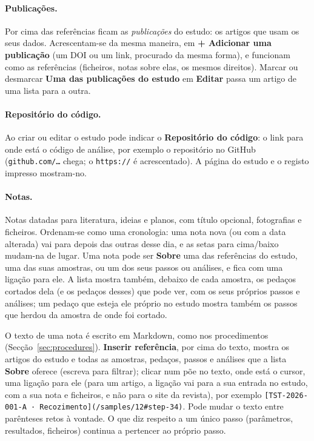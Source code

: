 \documentclass[11pt,a4paper]{article}
\newcommand{\ui}[1]{\textsf{\textbf{#1}}}
\begin{document}
\paragraph{Publicações.} Por cima das referências ficam as
\emph{publicações} do estudo: os artigos que usam os seus dados. Acrescentam-se
da mesma maneira, em \ui{+ Adicionar uma publicação} (um DOI ou um link,
procurado da mesma forma), e funcionam como as referências (ficheiros, notas
sobre elas, os mesmos direitos). Marcar ou desmarcar
\ui{Uma das publicações do estudo} em \ui{Editar} passa um artigo de uma
lista para a outra.

\paragraph{Repositório do código.} Ao criar ou editar o estudo pode indicar
o \ui{Repositório do código}: o link para onde está o código de análise, por
exemplo o repositório no GitHub (\texttt{github.com/\ldots} chega; o
\texttt{https://} é acrescentado). A página do estudo e o registo impresso
mostram-no.

\paragraph{Notas.} Notas datadas para literatura, ideias e planos, com
título opcional, fotografias e ficheiros. Ordenam-se como uma cronologia:
uma nota nova (ou com a data alterada) vai para depois das outras desse dia,
e as setas para cima/baixo mudam-na de lugar. Uma nota pode ser \ui{Sobre} uma
das referências do estudo, uma das suas amostras, ou um dos seus passos ou
análises, e fica com uma
ligação para ele. A lista mostra também, debaixo de cada amostra, os pedaços
cortados dela (e os pedaços desses) que pode ver, com os seus próprios passos
e análises; um pedaço que esteja ele próprio no estudo mostra também os passos
que herdou da amostra de onde foi cortado.

O texto de uma nota é escrito em Markdown, como nos procedimentos
(Secção~\ref{sec:procedures}). \ui{Inserir referência}, por cima do texto,
mostra os artigos do estudo e todas as amostras, pedaços, passos e análises
que a lista \ui{Sobre} oferece (escreva para filtrar); clicar num põe no
texto, onde está o cursor, uma ligação para ele (para um artigo, a ligação vai
para a sua entrada no estudo, com a sua nota e ficheiros, e não para o site da
revista), por exemplo
\texttt{[TST-2026-001-A · Recozimento](/samples/12\#step-34)}. Pode mudar o
texto entre parênteses retos à vontade. O que diz respeito a um único passo (parâmetros,
resultados, ficheiros) continua a pertencer ao próprio passo.
\end{document}
